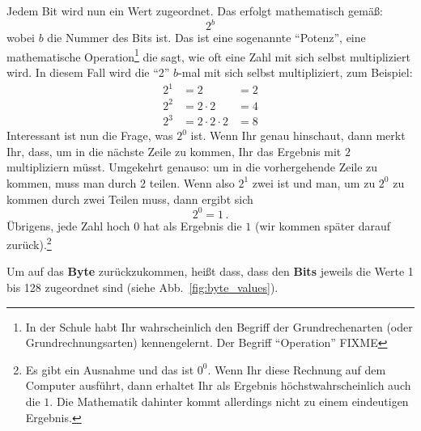 \noindent
Jedem Bit wird nun ein Wert zugeordnet. Das erfolgt mathematisch gemäß:
\begin{equation*}
  2^b
\end{equation*}
wobei $b$ die Nummer des Bits ist. Das ist eine sogenannte ``Potenz'', eine mathematische Operation\footnote{%
  In der Schule habt Ihr wahrscheinlich den Begriff der Grundrechenarten (oder Grundrechnungsarten) kennengelernt. Der Begriff ``Operation'' FIXME}
die sagt, wie oft eine Zahl mit sich selbst multipliziert wird. In diesem Fall wird die ``2'' $b$-mal mit sich selbst multipliziert, zum Beispiel:
\begin{align*}
  2^1 &= 2              &= 2\\
  2^2 &= 2\cdot2        &= 4\\
  2^3 &= 2\cdot2\cdot2  &= 8
\end{align*}
Interessant ist nun die Frage, was $2^0$ ist. Wenn Ihr genau hinschaut, dann merkt Ihr, dass, um in die nächste Zeile zu kommen, Ihr das Ergebnis mit $2$ multipliziern müsst. Umgekehrt genauso: um in die vorhergehende Zeile zu kommen, muss man durch $2$ teilen. Wenn also $2^1$ zwei ist und man, um zu $2^0$ zu kommen durch zwei Teilen muss, dann ergibt sich
\begin{equation*}
  2^0 = 1\,.
\end{equation*}
Übrigens, jede Zahl hoch $0$ hat als Ergebnis die $1$ (wir kommen später darauf zurück).\footnote{%
  Es gibt ein Ausnahme und das ist $0^0$. Wenn Ihr diese Rechnung auf dem Computer ausführt, dann erhaltet Ihr als Ergebnis höchstwahrscheinlich auch die $1$. Die Mathematik dahinter kommt allerdings nicht zu einem eindeutigen Ergebnis.}

Um auf das \textbf{Byte} zurückzukommen, heißt dass, dass den \textbf{Bits} jeweils die Werte 1 bis 128 zugeordnet sind (siehe Abb.~\ref{fig:byte_values}).

